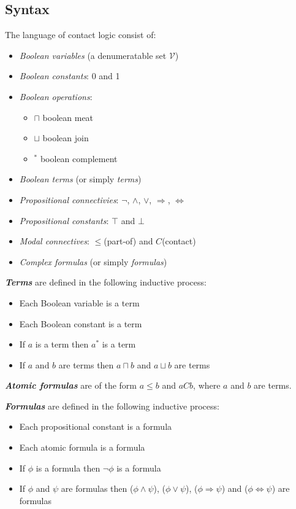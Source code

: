 \documentclass{article}
\newcommand\V{\mathcal{V}}
\begin{document}
	\subsection{Syntax}
	The language of contact logic consist of:
	\begin{itemize}
		\item \textit{Boolean variables} (a denumeratable set $\V$)
		\item \textit{Boolean constants}: 0 and 1
		\item \textit{Boolean operations}:
		\begin{itemize}
			\item $\sqcap$ boolean meat
			\item $\sqcup$ boolean join
			\item $^*$ boolean complement
		\end{itemize}
		\item \textit{Boolean terms} (or simply \textit{terms})
		\item \textit{Propositional connectivies}: $\neg$, $\land$, $\lor$, $\Rightarrow$, $\Leftrightarrow$
		\item \textit{Propositional constants}: $\top$ and $\bot$
		\item \textit{Modal connectives}: $\leq$(part-of) and $C$(contact)
		\item \textit{Complex formulas} (or simply \textit{formulas})
	\end{itemize}

	\noindent\textbf{\textit{Terms}} are defined in the following inductive process:
	\begin{itemize}
		\item Each Boolean variable is a term
		\item Each Boolean constant is a term
		\item If $a$ is a term then $a^*$ is a term
		\item If $a$ and $b$ are terms then $a \sqcap b$ and $a \sqcup b$ are terms
	\end{itemize}

	\noindent\textbf{\textit{Atomic formulas}} are of the form $a \leq b$ and $aCb$, where $a$ and $b$ are terms.

	\noindent\textbf{\textit{Formulas}} are defined in the following inductive process:
	\begin{itemize}
		\item Each propositional constant is a formula
		\item Each atomic formula is a formula
		\item If $\phi$ is a formula then $\neg\phi$ is a formula
		\item If $\phi$ and $\psi$ are formulas then ($\phi \land \psi$), ($\phi \lor \psi$), ($\phi \Rightarrow \psi$) and ($\phi \Leftrightarrow \psi$) are formulas
	\end{itemize}
\end{document}

